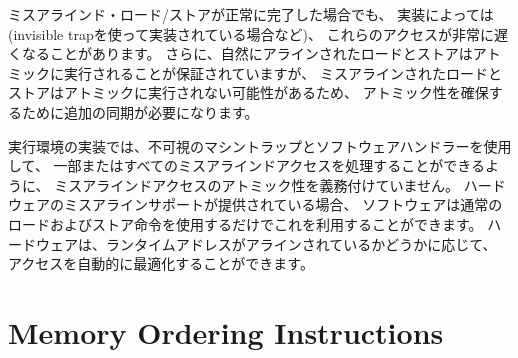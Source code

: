 \begin{comment}
Even when misaligned loads and stores complete successfully, these
accesses might run extremely slowly depending on the implementation
(e.g., when implemented via an invisible trap).  Furthermore, whereas
naturally aligned loads and stores are guaranteed to execute
atomically, misaligned loads and stores might not, and hence
require additional synchronization to ensure atomicity.
\end{comment}

ミスアラインド・ロード/ストアが正常に完了した場合でも、
実装によっては(invisible trapを使って実装されている場合など)、
これらのアクセスが非常に遅くなることがあります。 
さらに、自然にアラインされたロードとストアはアトミックに実行されることが保証されていますが、
ミスアラインされたロードとストアはアトミックに実行されない可能性があるため、
アトミック性を確保するために追加の同期が必要になります。

\begin{commentary}
\begin{comment}
We do not mandate atomicity for misaligned accesses so execution
environment implementations can use an invisible machine trap and
a software handler to handle some or all misaligned accesses.  If
hardware misaligned support is provided, software can exploit this by
simply using regular load and store instructions.  Hardware can then
automatically optimize accesses depending on whether runtime addresses
are aligned.
\end{comment}

実行環境の実装では、不可視のマシントラップとソフトウェアハンドラーを使用して、
一部またはすべてのミスアラインドアクセスを処理することができるように、
ミスアラインドアクセスのアトミック性を義務付けていません。 
ハードウェアのミスアラインサポートが提供されている場合、
ソフトウェアは通常のロードおよびストア命令を使用するだけでこれを利用することができます。 
ハードウェアは、ランタイムアドレスがアラインされているかどうかに応じて、
アクセスを自動的に最適化することができます。
\end{commentary}

\pagebreak

\section{Memory Ordering Instructions}
\label{sec:fence}

